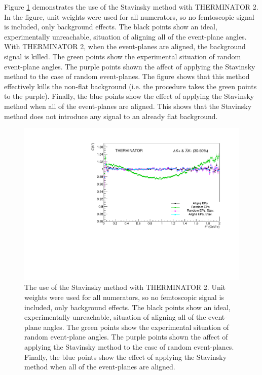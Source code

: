 \documentclass[../AnalysisNoteJBuxton.tex]{subfiles}
\begin{document}
Figure \ref{fig:BgdRedMethodsTHERM} demonstrates the use of the Stavinsky method with THERMINATOR 2.  In the figure, unit weights were used for all numerators, so no femtoscopic signal is included, only background effects.  The black points show an ideal, experimentally unreachable, situation of aligning all of the event-plane angles.  With THERMINATOR 2, when the event-planes are aligned, the background signal is killed.  The green points show the experimental situation of random event-plane angles.  The purple points shown the affect of applying the Stavinsky method to the case of random event-planes.  The figure shows that this method effectively kills the non-flat background (i.e. the procedure takes the green points to the purple).  Finally, the blue points show the effect of applying the Stavinsky method when all of the event-planes are aligned.  This shows that the Stavinsky method does not introduce any signal to an already flat background.


\begin{figure}[h]
  \centering
  \includegraphics[width=\textwidth]{5_Fitting/Figures/CompareBackgroundReductionMethods_Full_LamKchPwConj_3050_NumWeight1.pdf}
  \caption[Background reduction methods with THERMINATOR]{The use of the Stavinsky method with THERMINATOR 2.  Unit weights were used for all numerators, so no femtoscopic signal is included, only background effects.  The black points show an ideal, experimentally unreachable, situation of aligning all of the event-plane angles.  The green points show the experimental situation of random event-plane angles.  The purple points shown the affect of applying the Stavinsky method to the case of random event-planes.  Finally, the blue points show the effect of applying the Stavinsky method when all of the event-planes are aligned.}
  \label{fig:BgdRedMethodsTHERM}
\end{figure}
\end{document}
